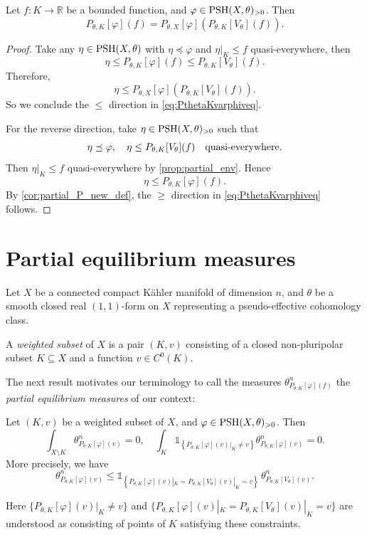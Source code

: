 \begin{corollary}\label{cor:PKtoPX}
    Let $f\colon K\rightarrow \mathbb{R}$ be a bounded function, and $\varphi\in \mathrm{PSH}(X,\theta)_{>0}$. Then
\begin{equation}\label{eq:PthetaKvarphiveq}
P_{\theta,K}[\varphi](f)=P_{\theta,X}[\varphi]\left( P_{\theta,K}[V_{\theta}](f) \right).
\end{equation}
\end{corollary}
\begin{proof}
Take any $\eta\in \mathrm{PSH}(X,\theta)$ with $\eta\preceq \varphi$ and $\eta|_K\leq f$ quasi-everywhere, then
\[
\eta\leq P_{\theta,K}[\varphi](f)\leq P_{\theta,K}[V_{\theta}](f).
\]
Therefore,
\[
\eta\leq P_{\theta,X}[\varphi]\left( P_{\theta,K}[V_{\theta}](f) \right).
\]
So we conclude the $\leq$ direction in \eqref{eq:PthetaKvarphiveq}.

For the reverse direction, take $\eta\in \mathrm{PSH}(X,\theta)_{>0}$ such that
\[
\eta\preceq \varphi,\quad \eta\leq P_{\theta,K}[V_{\theta}](f) \quad \textup{quasi-everywhere}.
\]
Then $\eta|_K\leq f$ quasi-everywhere by \cref{prop:partial_env}. Hence
\[
\eta\leq P_{\theta,K}[\varphi](f).
\]
By \cref{cor:partial_P_new_def}, the $\geq$ direction in \eqref{eq:PthetaKvarphiveq} follows.
\end{proof}

\section{Partial equilibrium measures}\label{sec:pem}
Let $X$ be a connected compact Kähler manifold of dimension $n$, and $\theta$ be a smooth closed real $(1,1)$-form on $X$ representing a pseudo-effective cohomology class.

\begin{definition}\label{def:weightedss}
A \emph{weighted subset} of $X$ is a pair $(K,v)$ consisting of a closed non-pluripolar subset $K\subseteq X$ and a function $v\in C^0(K)$.
\end{definition}
The next result motivates our terminology to call the measures $\theta_{P_{\theta,K}[\varphi](f)}^n$ the \emph{partial equilibrium measures} of our context:
\begin{lemma}\label{lma:balayage}
Let $(K,v)$ be a weighted subset of $X$, and $\varphi\in \mathrm{PSH}(X,\theta)_{>0}$.
Then
\begin{equation}\label{eq:intXminusKthetan_vanish}
\int_{X\setminus K}\theta_{P_{\theta,K}[\varphi](v)}^n=0,\quad \int_K \mathds{1}_{\left\{P_{\theta,K}[\varphi](v)|_K\neq v\right\}}\theta_{P_{\theta,K}[\varphi](v)}^n=0.
\end{equation}
More precisely, we have
\begin{equation}\label{eq:thetaPKuv}
\theta_{P_{\theta,K}[\varphi](v)}^n\leq \mathds{1}_{\left\{P_{\theta,K}[\varphi](v)|_K=P_{\theta,K}[V_{\theta}](v)|_K=v\right\}}\,\theta_{P_{\theta,K}[V_{\theta}](v)}^n.
\end{equation}
\end{lemma}
Here $\{P_{\theta,K}[\varphi](v)|_K\neq v\}$ and $\{P_{\theta,K}[\varphi](v)|_K=P_{\theta,K}[V_{\theta}](v)|_K=v\}$ are understood as consisting of points of $K$ satisfying these constraints.


